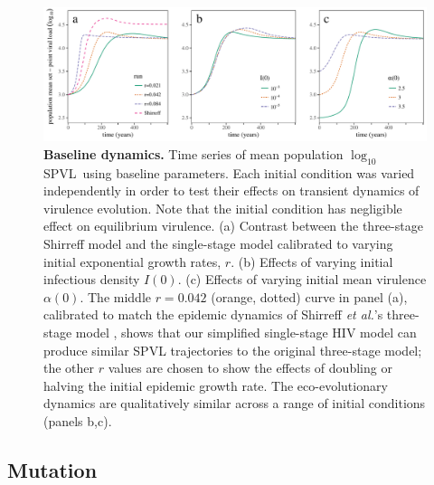 \documentclass[10pt,letterpaper]{article}
\newcommand{\Lspvl}{$\log_{10}$ SPVL}
\newcommand{\etal}{\textit{et al.}}
\begin{document}
\begin{figure}[!ht]
\includegraphics[width=\textwidth]{../figures/fig1.pdf}
\caption{{\bf Baseline dynamics.}
Time series of mean population \Lspvl\ using baseline parameters. Each initial condition was varied independently in order to test their effects on transient dynamics of virulence evolution. Note that the initial condition has negligible effect on equilibrium virulence.
(a) Contrast between the three-stage Shirreff model and the single-stage model calibrated to varying initial exponential growth rates, $r$.
(b) Effects of varying initial infectious density $I(0)$.
(c) Effects of varying initial mean virulence $\alpha(0)$.
The middle $r=0.042$ (orange, dotted) curve in panel (a), calibrated to match the epidemic dynamics of Shirreff \etal's three-stage model \cite{shirreff_transmission_2011}, shows that our simplified single-stage HIV model can produce similar SPVL trajectories to the original three-stage model; the other $r$ values are chosen to show the effects of doubling or halving the initial epidemic growth rate. 
The eco-evolutionary dynamics are qualitatively similar
across a range of initial conditions (panels b,c).}
\label{fig:panel3}
\end{figure}

\subsection*{Mutation}
\end{document}
